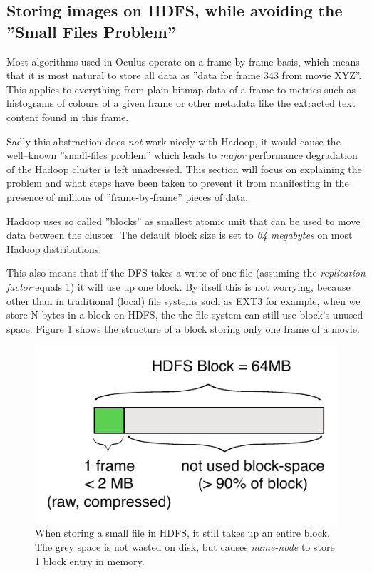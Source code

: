 \subsection{Storing images on HDFS, while avoiding the ''Small Files Problem''}
\label{sec:sequence-files}
Most algorithms used in Oculus operate on a frame-by-frame basis, which means that it is most natural to store all data as ''data for frame 343 from movie XYZ''. This applies to everything from plain bitmap data of a frame to metrics such as histograms of colours of a given frame or other metadata like the extracted text content found in this frame.

Sadly this abstraction does \textit{not} work nicely with Hadoop, it would cause the well--known ''small-files problem'' which leads to \textit{major} performance degradation of the Hadoop cluster is left unadressed. This section will focus on explaining the problem and what steps have been taken to prevent it from manifesting in the presence of millions of ''frame-by-frame'' pieces of data.

Hadoop uses so called ''blocks'' as smallest atomic unit that can be used to move data between the cluster.
The default block size is set to \textit{64 megabytes} on most Hadoop distributions.

This also means that if the DFS takes a write of one file (assuming the \textit{replication factor} equals 1) it will use up one block. By itself this is not worrying, because other than in traditional (local) file systems such as EXT3 for example, when we store N bytes in a block on HDFS,
the the file system can still use block's unused space. Figure \ref{fig:no-sequence-file} shows the structure of a block storing only one frame of a movie.

\begin{figure}[ch!]
  \centering
  \includegraphics[scale=0.9]{diagrams/no-sequence-file.pdf}
  \caption{When storing a small file in HDFS, it still takes up an entire block. The grey space is not wasted on disk, but causes \textit{name-node} to store 1 block entry in memory.}
  \label{fig:no-sequence-file}
\end{figure}

